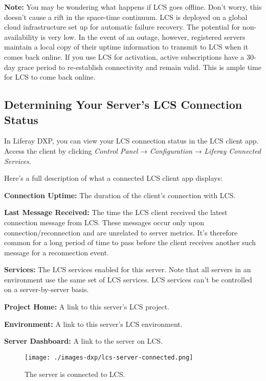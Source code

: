 \noindent\hrulefill

\textbf{Note:} You may be wondering what happens if LCS goes offline.
Don't worry, this doesn't cause a rift in the space-time continuum. LCS
is deployed on a global cloud infrastructure set up for automatic
failure recovery. The potential for non-availability is very low. In the
event of an outage, however, registered servers maintain a local copy of
their uptime information to transmit to LCS when it comes back online.
If you use LCS for activation, active subscriptions have a 30-day grace
period to re-establish connectivity and remain valid. This is ample time
for LCS to come back online.

\noindent\hrulefill

\subsection{Determining Your Server's LCS Connection
Status}\label{determining-your-servers-lcs-connection-status}

In Liferay DXP, you can view your LCS connection status in the LCS
client app. Access the client by clicking \emph{Control Panel} →
\emph{Configuration} → \emph{Liferay Connected Services}.

Here's a full description of what a connected LCS client app displays:

\textbf{Connection Uptime:} The duration of the client's connection with
LCS.

\textbf{Last Message Received:} The time the LCS client received the
latest connection message from LCS. These messages occur only upon
connection/reconnection and are unrelated to server metrics. It's
therefore common for a long period of time to pass before the client
receives another such message for a reconnection event.

\textbf{Services:} The LCS services enabled for this server. Note that
all servers in an environment use the same set of LCS services. LCS
services can't be controlled on a server-by-server basis.

\textbf{Project Home:} A link to this server's LCS project.

\textbf{Environment:} A link to this server's LCS environment.

\textbf{Server Dashboard:} A link to the server on LCS.

\begin{figure}
\centering
\texttt{[image: ./images-dxp/lcs-server-connected.png]}
\caption{The server is connected to LCS.}
\end{figure}

